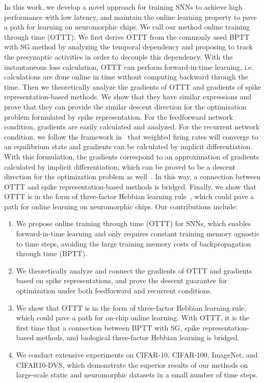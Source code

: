 \documentclass{article}
\begin{document}
In this work, we develop a novel approach for training SNNs to achieve high performance with low latency, and maintain the online learning property to pave a path for learning on neuromorphic chips. We call our method online training through time (OTTT). We first derive OTTT from the commonly used BPTT with SG method by analyzing the temporal dependency and proposing to track the presynaptic activities in order to decouple this dependency. With the instantaneous loss calculation, OTTT can perform forward-in-time learning, i.e. calculations are done online in time without computing backward through the time. Then we theoretically analyze the gradients of OTTT and gradients of spike representation-based methods. 
We show that they have similar expressions and prove that they can provide the similar descent direction for the optimization problem formulated by spike representation. For the feedforward network condition, gradients are easily calculated and analyzed. For the recurrent network condition, we follow the framework in~\cite{xiao2021training} that weighted firing rates will converge to an equilibrium state and gradients can be calculated by implicit differentiation. With this formulation, the gradients correspond to an approximation of gradients calculated by implicit differentiation, which can be proved to be a descent direction for the optimization problem as well~\cite{fung2021jfb,geng2021training}. 
In this way, a connection between OTTT and spike representation-based methods is bridged. Finally, we show that OTTT is in the form of three-factor Hebbian learning rule~\cite{fremaux2016neuromodulated}, which could pave a path for online learning on neuromorphic chips. Our contributions include:

\vspace{-2mm}
\begin{enumerate}
    \item We propose online training through time (OTTT) for SNNs, which enables forward-in-time learning and only requires constant training memory agnostic to time steps, avoiding the large training memory costs of backpropagation through time (BPTT).
    \item We theoretically analyze and connect the gradients of OTTT and gradients based on spike representations, and prove the descent guarantee for optimization under both feedforward and recurrent conditions.
    \item We show that OTTT is in the form of three-factor Hebbian learning rule, which could pave a path for on-chip online learning. With OTTT, it is the first time that a connection between BPTT with SG, spike representation-based methods, and biological three-factor Hebbian learning is bridged.
    \item We conduct extensive experiments on CIFAR-10, CIFAR-100, ImageNet, and CIFAR10-DVS, which demonstrate the superior results of our methods on large-scale static and neuromorphic datasets in a small number of time steps.
\end{enumerate}
\end{document}
